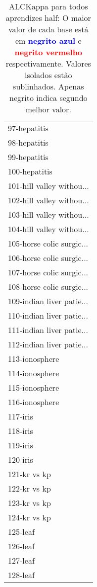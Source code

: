 \begin{table}[h]
\caption{ALCKappa para todos aprendizes half: O maior valor de cada base está em \textcolor{blue}{\textbf{negrito azul}} e \textcolor{red}{\textbf{negrito vermelho}} respectivamente. Valores isolados estão sublinhados. Apenas negrito indica segundo melhor valor.}
\begin{center}\begin{tabular}{l}
 & \\ \hline 97-hepatitis &  \\
98-hepatitis &  \\
99-hepatitis &  \\
100-hepatitis &  \\
101-hill valley withou... &  \\
102-hill valley withou... &  \\
103-hill valley withou... &  \\ \hline
104-hill valley withou... &  \\
105-horse colic surgic... &  \\
106-horse colic surgic... &  \\
107-horse colic surgic... &  \\
108-horse colic surgic... &  \\
109-indian liver patie... &  \\
110-indian liver patie... &  \\ \hline
111-indian liver patie... &  \\
112-indian liver patie... &  \\
113-ionosphere &  \\
114-ionosphere &  \\
115-ionosphere &  \\
116-ionosphere &  \\
117-iris &  \\ \hline
118-iris &  \\
119-iris &  \\
120-iris &  \\
121-kr vs kp &  \\
122-kr vs kp &  \\
123-kr vs kp &  \\
124-kr vs kp &  \\ \hline
125-leaf &  \\
126-leaf &  \\
127-leaf &  \\
128-leaf &  \\\end{tabular}\label{stratsALCKappa3AllReduxallb}
\end{center}
\end{table}

